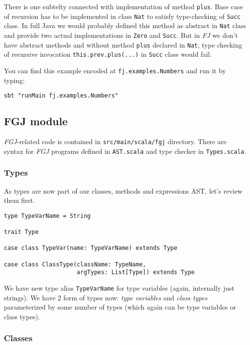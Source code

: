 \documentclass{article}[12pt]
\begin{document}
There is one subtelty connected with implementation of method
\texttt{plus}. Base case of recursion has to be implemented in
class \texttt{Nat} to satisfy type-checking of \texttt{Succ}
class. In full Java we would probably defined this method as
abstract in \texttt{Nat} class and provide two actual
implementations in \texttt{Zero} and \texttt{Succ}. But in
\emph{FJ} we don't have abstract methods and without method
\texttt{plus} declared in \texttt{Nat}, type checking of
recursive invocation \texttt{this.prev.plus(...)} in
\texttt{Succ} class would fail.

You can find this example encoded at \texttt{fj.examples.Numbers}
and run it by typing:

\begin{verbatim}
sbt "runMain fj.examples.Numbers"
\end{verbatim}


\subsection{FGJ module}

\emph{FGJ}-related code is contained in \texttt{src/main/scala/fgj}
directory. There are syntax for \emph{FGJ} programs defined in
\texttt{AST.scala} and type checker in \texttt{Types.scala}.

\subsubsection{Types}

As types are now part of our classes, methods and expressions
AST, let's review them first.

\begin{verbatim}
type TypeVarName = String

trait Type

case class TypeVar(name: TypeVarName) extends Type

case class ClassType(className: TypeName,
                     argTypes: List[Type]) extends Type
\end{verbatim}

We have new type alias \texttt{TypeVarName} for type variables
(again, internally just strings). We have 2 form of types now:
\emph{type variables} and \emph{class types} parameterized by
some number of types (which again can be type variables or
class types).

\subsubsection{Classes}
\end{document}
